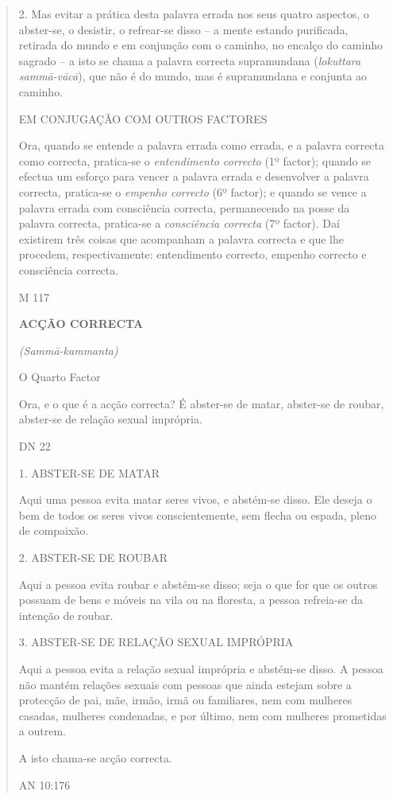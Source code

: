 \begin{quote}
2. Mas evitar a prática desta palavra errada nos seus quatro aspectos, o abster-se, o desistir, o refrear-se disso -- a mente estando purificada, retirada do mundo e em conjunção com o caminho, no encalço do caminho sagrado -- a isto se chama a palavra correcta supramundana (\emph{lokuttara sammā-vācā}), que não é do mundo, mas é supramundana e conjunta ao caminho.

EM CONJUGAÇÃO COM OUTROS FACTORES

Ora, quando se entende a palavra errada como errada, e a palavra correcta como correcta, pratica-se o \emph{entendimento correcto} (1º factor); quando se efectua um esforço para vencer a palavra errada e desenvolver a palavra correcta, pratica-se o \emph{empenho correcto} (6º factor); e quando se vence a palavra errada com consciência correcta, permanecendo na posse da palavra correcta, pratica-se a \emph{consciência correcta} (7º factor). Daí existirem três coisas que acompanham a palavra correcta e que lhe procedem, respectivamente: entendimento correcto, empenho correcto e consciência correcta.

M 117

\textbf{ACÇÃO CORRECTA}

\emph{(Sammā-kammanta)}

O Quarto Factor

Ora, e o que é a acção correcta? É abster-se de matar, abster-se de roubar, abster-se de relação sexual imprópria.

DN 22

1. ABSTER-SE DE MATAR

Aqui uma pessoa evita matar seres vivos, e abstém-se disso. Ele deseja o bem de todos os seres vivos conscientemente, sem flecha ou espada, pleno de compaixão.

2. ABSTER-SE DE ROUBAR

Aqui a pessoa evita roubar e abstém-se disso; seja o que for que os outros possuam de bens e móveis na vila ou na floresta, a pessoa refreia-se da intenção de roubar.

3. ABSTER-SE DE RELAÇÃO SEXUAL IMPRÓPRIA

Aqui a pessoa evita a relação sexual imprópria e abstém-se disso. A pessoa não mantém relações sexuais com pessoas que ainda estejam sobre a protecção de pai, mãe, irmão, irmã ou familiares, nem com mulheres casadas, mulheres condenadas, e por último, nem com mulheres prometidas a outrem.

A isto chama-se acção correcta.

AN 10:176


\end{quote}

